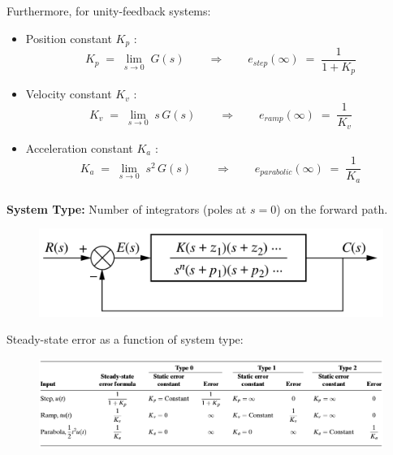 \documentclass[ 10pt, xcolor = dvipsnames]{beamer}
\begin{document}
\begin{frame}[allowframebreaks]
\frametitle{\insertsection}

Furthermore, for unity-feedback systems: 
\begin{itemize}
\item Position constant $K_p$ :
\[
K_p \; = \; \lim_{ s \rightarrow 0 } \; G(s)
\qquad \Longrightarrow \qquad
e_{step}(\infty) \; = \; \frac{1}{1 + K_p}
\]
\item Velocity constant $K_v$ :
\[
K_v \; = \; \lim_{ s \rightarrow 0 } \; s \,G(s)
\qquad \Longrightarrow \qquad
e_{ramp}(\infty) \; = \; \frac{1}{K_v}
\]
\item Acceleration constant $K_a$ :
\[
K_a \; = \; \lim_{ s \rightarrow 0 } \; s^2 \,G(s)
\qquad \Longrightarrow \qquad
e_{parabolic}(\infty) \; = \; \frac{1}{K_a}
\]
\end{itemize}

\end{frame}

\begin{frame}[allowframebreaks]
\frametitle{\insertsection}

\textbf{System Type:}
Number of integrators (poles at $s = 0$) on the forward path.

\begin{figure}
\centering
\includegraphics[width=0.6\columnwidth]{figures/Nise_Fig-7-8.jpg}
\end{figure}
\fullskip

Steady-state error as a function of system type:
\begin{figure}
\centering
\includegraphics[width=\columnwidth]{figures/Nise_Table-7-2.jpg}
\end{figure}

\end{frame}
\end{document}
